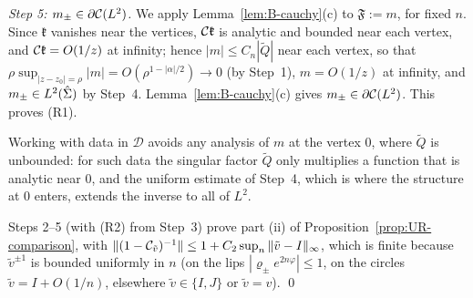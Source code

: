 \emph{Step 5: $m_\pm\in\partial\mathcal{C}(L^2)$.} We apply Lemma~\ref{lem:B-cauchy}(c) to $\mathfrak F:=m$, for fixed $n$. Since $\mathfrak k$ vanishes
near the vertices, $\mathcal{C}\mathfrak k$ is analytic and bounded near each vertex, and $\mathcal{C}\mathfrak k=O(1/z)$ at infinity;
hence $|m|\le C_n|\tilde Q|$ near each vertex, so that $\rho\sup_{|z-z_0|=\rho}|m|=O(\rho^{1-|\alpha|/2})\to0$ (by Step~1),
$m=O(1/z)$ at infinity, and $m_\pm\in L^2(\hat\Sigma)$ by Step~4. Lemma~\ref{lem:B-cauchy}(c) gives $m_\pm\in\partial\mathcal{C}(L^2)$. This
proves (R1).

Working with data in $\mathcal D$ avoids any analysis of $m$ at the vertex $0$, where $\tilde Q$ is unbounded: for such
data the singular factor $\tilde Q$ only multiplies a function that is analytic near $0$, and the uniform estimate of
Step~4, which is where the structure at $0$ enters, extends the inverse to all of $L^2$.

Steps 2--5 (with (R2) from Step~3) prove part (ii) of Proposition~\ref{prop:UR-comparison}, with $\|(1-\mathcal{C}_{\tilde v})^{-1}\|\le1+C_2\sup_n\|\tilde v-I\|_\infty$,
which is finite because $\tilde v^{\pm1}$ is bounded uniformly in $n$ (on the lips $|\varrho_\pm e^{2n\varphi}|\le1$, on the circles
$\tilde v=I+O(1/n)$, elsewhere $\tilde v\in\{I,J\}$ or $\tilde v=v$). \qed
